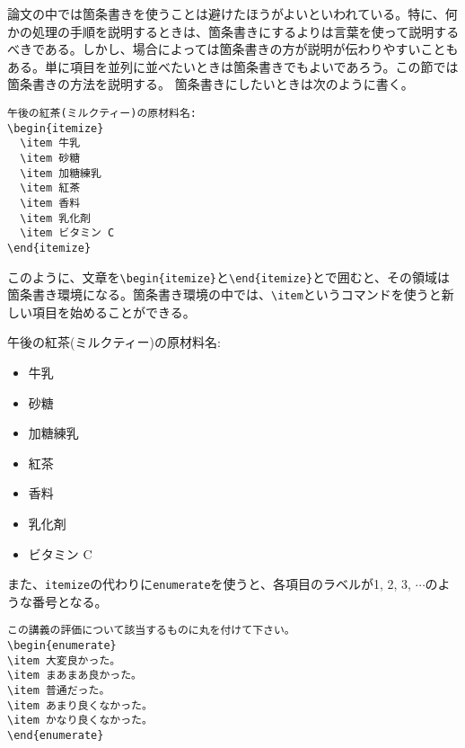 論文の中では箇条書きを使うことは避けたほうがよいといわれている。特に、何かの処理の手順を説明するときは、箇条書きにするよりは言葉を使って説明するべきである。しかし、場合によっては箇条書きの方が説明が伝わりやすいこともある。単に項目を並列に並べたいときは箇条書きでもよいであろう。この節では箇条書きの方法を説明する。
箇条書きにしたいときは次のように書く。
\begin{reidai}
\begin{verbatim}
午後の紅茶(ミルクティー)の原材料名:
\begin{itemize}
  \item 牛乳
  \item 砂糖
  \item 加糖練乳
  \item 紅茶
  \item 香料
  \item 乳化剤
  \item ビタミン C
\end{itemize}
\end{verbatim}
\end{reidai} \noindent
このように、文章を\verb|\begin{itemize}|と\verb|\end{itemize}|とで囲むと、その領域は箇条書き環境になる。箇条書き環境の中では、\verb|\item|というコマンドを使うと新しい項目を始めることができる。
\begin{kekka}
  \def\labelitemisave{\labelitemi}
  \def\labelitemi{$\bullet$}
  午後の紅茶(ミルクティー)の原材料名:
  \begin{itemize}
  \item 牛乳
  \item 砂糖
  \item 加糖練乳
  \item 紅茶
  \item 香料
  \item 乳化剤
  \item ビタミン C
  \end{itemize}
  \def\labelitemi{\labelitemisave}
\end{kekka} \noindent
また、\texttt{itemize}の代わりに\texttt{enumerate}を使うと、各項目のラベルが1, 2, 3, $\cdots$のような番号となる。
\begin{reidai}
\begin{verbatim}
この講義の評価について該当するものに丸を付けて下さい。
\begin{enumerate}
\item 大変良かった。
\item まあまあ良かった。
\item 普通だった。
\item あまり良くなかった。
\item かなり良くなかった。
\end{enumerate}
\end{verbatim}
\end{reidai}
